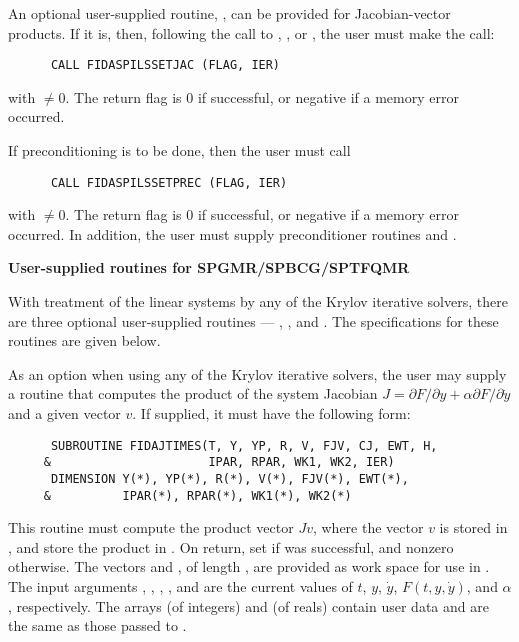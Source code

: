 \begin{Steps}
  An optional user-supplied routine, , can be provided for
  Jacobian-vector products.  If it is, then, following the call to
  , , or , the user must make the call:
\begin{verbatim}
      CALL FIDASPILSSETJAC (FLAG, IER)
\end{verbatim}
  with  $\neq 0$.  The return flag  is 0 if successful,
  or negative if a memory error occurred.

  If preconditioning is to be done, then the user must call
\begin{verbatim}
      CALL FIDASPILSSETPREC (FLAG, IER)
\end{verbatim}
  with  $\neq 0$.  The return flag  is 0 if successful,
  or negative if a memory error occurred.  In addition, the user must
  supply preconditioner routines  and .


  {\s}{\p} {\bf User-supplied routines for SPGMR/SPBCG/SPTFQMR}

  With treatment of the linear systems by any of the Krylov iterative
  solvers, there are three optional user-supplied routines ---
  , , and .  The specifications
  for these routines are given below.

  As an option when using any of the Krylov iterative solvers, the user may
  supply a routine that computes the product of the system Jacobian
  $J = \partial F / \partial y + \alpha \partial F / \partial \dot{y}$
  and a given vector $v$.  If supplied, it must have the following form:
\begin{verbatim}
      SUBROUTINE FIDAJTIMES(T, Y, YP, R, V, FJV, CJ, EWT, H, 
     &                      IPAR, RPAR, WK1, WK2, IER)
      DIMENSION Y(*), YP(*), R(*), V(*), FJV(*), EWT(*), 
     &          IPAR(*), RPAR(*), WK1(*), WK2(*)
\end{verbatim}
  This routine must compute the product vector $Jv$, where the vector $v$ is
  stored in , and store the product in .  On return, set
   if  was successful, and nonzero otherwise.
  The vectors  and , of length , are
  provided as work space for use in .
  The input arguments , , , , and  are the
  current values of $t$, $y$, $\dot{y}$, $F(t,y,\dot{y})$, and $\alpha$, respectively.
  The arrays  (of integers) and  (of reals) contain user data
  and are the same as those passed to .


\end{Steps}
